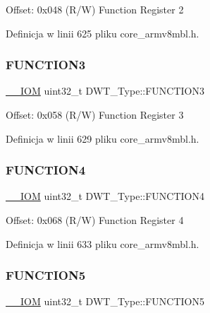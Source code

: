 Offset\+: 0x048 (R/W) Function Register 2 

Definicja w linii 625 pliku core\+\_\+armv8mbl.\+h.

\mbox{\label{struct_d_w_t___type_a52d4ff278fae6f9216c63b74ce328841}} 
\subsubsection{\texorpdfstring{F\+U\+N\+C\+T\+I\+O\+N3}{FUNCTION3}}
{\footnotesize\ttfamily \hyperlink{core__sc300_8h_ab6caba5853a60a17e8e04499b52bf691}{\+\_\+\+\_\+\+I\+OM} uint32\+\_\+t D\+W\+T\+\_\+\+Type\+::\+F\+U\+N\+C\+T\+I\+O\+N3}

Offset\+: 0x058 (R/W) Function Register 3 

Definicja w linii 629 pliku core\+\_\+armv8mbl.\+h.

\mbox{\label{struct_d_w_t___type_a2fa7fd33c3fae711e0d0e683f29b5b6d}} 
\subsubsection{\texorpdfstring{F\+U\+N\+C\+T\+I\+O\+N4}{FUNCTION4}}
{\footnotesize\ttfamily \hyperlink{core__sc300_8h_ab6caba5853a60a17e8e04499b52bf691}{\+\_\+\+\_\+\+I\+OM} uint32\+\_\+t D\+W\+T\+\_\+\+Type\+::\+F\+U\+N\+C\+T\+I\+O\+N4}

Offset\+: 0x068 (R/W) Function Register 4 

Definicja w linii 633 pliku core\+\_\+armv8mbl.\+h.

\mbox{\label{struct_d_w_t___type_a2f33ef0ce606e4850ecde8d044f7bb5b}} 
\subsubsection{\texorpdfstring{F\+U\+N\+C\+T\+I\+O\+N5}{FUNCTION5}}
{\footnotesize\ttfamily \hyperlink{core__sc300_8h_ab6caba5853a60a17e8e04499b52bf691}{\+\_\+\+\_\+\+I\+OM} uint32\+\_\+t D\+W\+T\+\_\+\+Type\+::\+F\+U\+N\+C\+T\+I\+O\+N5}

